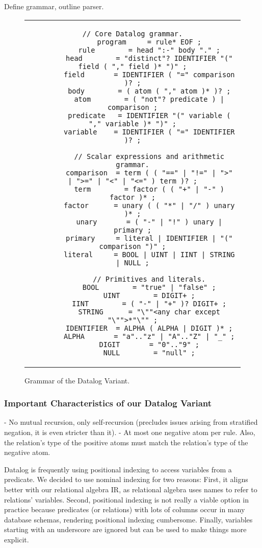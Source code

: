 Define grammar, outline parser.

\begin{figure}[htpb]
	\centering
	\begin{tabular}{c}
		\begin{lstlisting}[keepspaces]
		// Core Datalog grammar.
		program     = rule* EOF ;
        rule        = head ":-" body "." ;
        head        = "distinct"? IDENTIFIER "(" field ( "," field )* ")" ;
        field       = IDENTIFIER ( "=" comparison )? ;
        body        = ( atom ( "," atom )* )? ;
        atom        = ( "not"? predicate ) | comparison ;
        predicate   = IDENTIFIER "(" variable ( "," variable )* ")" ;
        variable    = IDENTIFIER ( "=" IDENTIFIER )? ;

        // Scalar expressions and arithmetic grammar.
		comparison  = term ( ( "==" | "!=" | ">" | ">=" | "<" | "<=" ) term )? ;
		term        = factor ( ( "+" | "-" ) factor )* ;
		factor      = unary ( ( "*" | "/" ) unary )* ;
		unary       = ( "-" | "!" ) unary | primary ;
		primary     = literal | IDENTIFIER | "(" comparison ")" ;
		literal     = BOOL | UINT | IINT | STRING | NULL ;

		// Primitives and literals.
		BOOL        = "true" | "false" ;
		UINT        = DIGIT+ ;
		IINT        = ( "-" | "+" )? DIGIT+ ;
		STRING      = "\""<any char except "\"">*"\"" ;
		IDENTIFIER  = ALPHA ( ALPHA | DIGIT )* ;
		ALPHA       = "a".."z" | "A".."Z" | "_" ;
		DIGIT       = "0".."9" ;
		NULL        = "null" ;
        \end{lstlisting}
	\end{tabular}
	\caption{Grammar of the Datalog Variant.}\label{code:datalog-grammar}
\end{figure}

\subsubsection{Important Characteristics of our Datalog Variant}

- No mutual recursion, only self-recursion (precludes issues arising from
stratified negation, it is even stricter than it).
- At most one negative atom per rule. Also, the relation's type of the
positive atoms must match the relation's type of the negative atom.

Datalog is frequently using positional indexing to access variables from a
predicate. We decided to use nominal indexing for two reasons:
First, it aligns better with our relational algebra IR,
as relational algebra uses names to refer to relations' variables.
Second, positional indexing is not really a viable option in practice because
predicates (or relations) with lots of columns occur in many database schemas,
rendering positional indexing cumbersome.
Finally, variables starting with an underscore are ignored but can be used
to make things more explicit.

